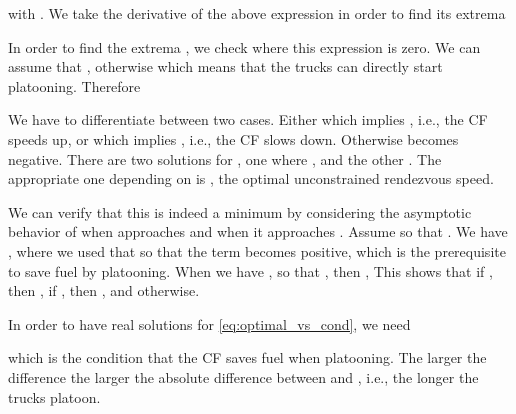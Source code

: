 \documentclass[letterpaper,10pt,conference,twocolumn]{IEEEtran}
\theoremstyle{definition}
\begin{document}
with . We take the derivative of the above expression in order to find its extrema

In order to find the extrema , we check where this expression is zero. We can assume that , otherwise  which means that the trucks can directly start platooning. Therefore 

We have to differentiate between two cases. Either  which implies , i.e., the CF speeds up, or  which implies , i.e., the CF slows down. Otherwise  becomes negative. There are two solutions for , one where , and the other . The appropriate one depending on  is , the optimal unconstrained rendezvous speed.

We can verify that this is indeed a minimum by considering the asymptotic behavior of  when  approaches  and when it approaches . Assume  so that . We have
,
where we used that  so that the term  becomes positive, which is the prerequisite to save fuel by platooning. 
When we have , so that , then
,
This shows that if , then , if , then , and  otherwise.

In order to have real solutions for \eqref{eq:optimal_vs_cond}, we need

which is the condition that the CF saves fuel when platooning. The larger the difference  the larger the absolute difference between  and , i.e., the longer the trucks platoon. 



\end{document}
